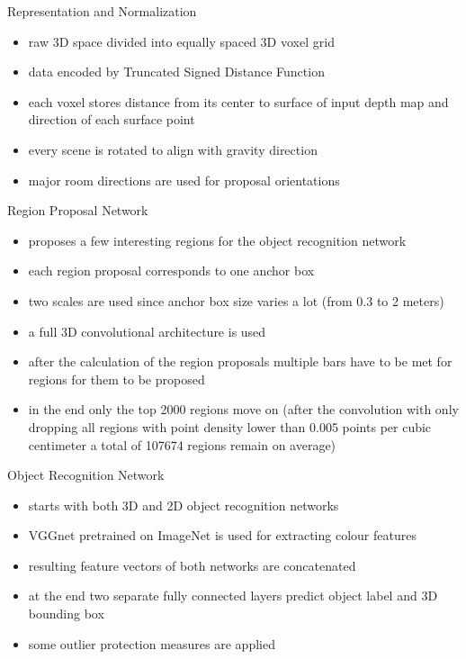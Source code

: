 \documentclass{beamer}
\begin{document}
\begin{frame}{Representation and Normalization}
    \begin{itemize}
        \item raw 3D space divided into equally spaced 3D voxel grid
        \vfill
        \item data encoded by Truncated Signed Distance Function
        \vfill
        \item each voxel stores distance from its center to surface of input depth
              map and direction of each surface point
        \vfill
        \item every scene is rotated to align with gravity direction
        \vfill
        \item major room directions are used for proposal orientations
    \end{itemize}
\end{frame}

\begin{frame}{Region Proposal Network}
    \begin{itemize}
        \item proposes a few interesting regions for the object recognition network
        \vfill
        \item each region proposal corresponds to one anchor box
        \vfill
        \item two scales are used since anchor box size varies a lot (from 0.3
              to 2 meters)
        \vfill
        \item a full 3D convolutional architecture is used
        \vfill
        \item after the calculation of the region proposals multiple bars have
              to be met for regions for them to be proposed
        \vfill
        \item in the end only the top 2000 regions move on (after the convolution
              with only dropping all regions with point density lower than 0.005
              points per cubic centimeter a total of 107674 regions remain on average)
    \end{itemize}
\end{frame}

\begin{frame}{Object Recognition Network}
    \begin{itemize}
        \item starts with both 3D and 2D object recognition networks
        \vfill
        \item VGGnet pretrained on ImageNet is used for extracting colour features
        \vfill
        \item resulting feature vectors of both networks are concatenated
        \vfill
        \item at the end two separate fully connected layers predict object label
              and 3D bounding box
        \vfill
        \item some outlier protection measures are applied
    \end{itemize}
\end{frame}
\end{document}
